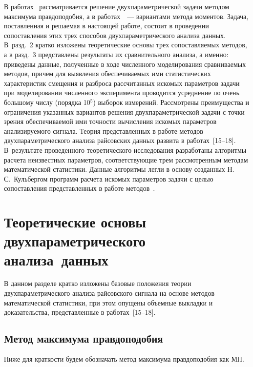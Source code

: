 \begin{multicols}{2}
     В работах~\cite{15-ya, 16-ya} рассматривается решение двухпараметрической
задачи методом максимума правдоподобия, а в работах~\cite{17-ya, 18-ya}~---
вариантами метода моментов. Задача, поставленная и решаемая в настоящей работе,
состоит в проведении со\-по\-став\-ле\-ния этих трех способов двухпараметрического анализа
данных. В~разд.~2 кратко изложены теоретические основы трех сопоставляемых
методов, а в разд.~3 представлены результаты их сравнительного анализа, а именно:
приведены данные, полученные в ходе численного моделирования срав\-ни\-ва\-емых
методов, причем для выявления обес\-пе\-чи\-ва\-емых ими статистических характеристик
смещения и разброса рассчитанных искомых параметров задачи при моделировании
численного эксперимента проводится усреднение по очень большому числу (порядка
10$^5$) выборок измерений. Рассмотрены преимущества и ограничения указанных
вариантов решения двухпараметрической задачи с точки зрения обеспечиваемой ими
точности вычисления искомых параметров анализируемого сигнала. Тео\-рия
представленных в работе методов двух\-па\-ра\-мет\-ри\-че\-ско\-го анализа райсовских данных
развита в работах~[15--18]. В~результате
проведенного теоретического исследования разработаны алгоритмы расчета
неизвестных параметров, соответствующие трем рассмотренным методам
математической статистики. Данные алгоритмы легли в основу созданных
Н.\,С.~Кульбергом программ расчета искомых параметров задачи с целью
сопоставления пред\-став\-лен\-ных в работе методов~\cite{16-ya, 17-ya}.

\section{Теоретические основы двухпараметрического анализа~данных }

     В данном разделе кратко изложены базовые положения теории
двухпараметрического анализа райсовского сигнала на основе методов математической
статистики, при этом опущены объемные выкладки и доказательства, представленные в
работах~[15--18].

\subsection{Метод максимума правдоподобия}

    Ниже для краткости будем обозначать метод максимума правдоподобия как МП.


\end{multicols}
